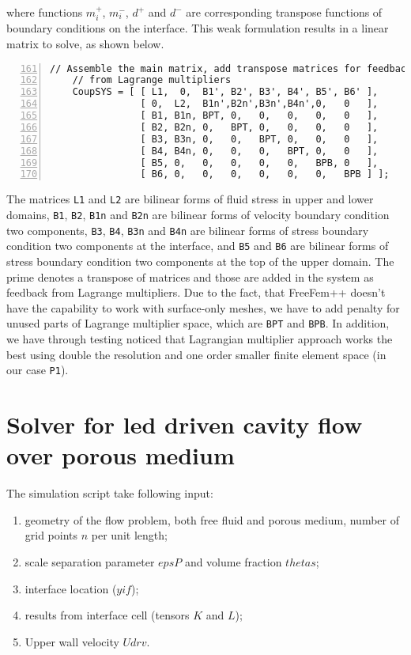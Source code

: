 \documentclass[12pt,a4paper]{article}
\begin{document}
where functions $m^{+}_i$, $m^{-}_i$, $d^{+}$ and $d^{-}$ are corresponding transpose functions of boundary conditions on the interface. This weak formulation results in a linear matrix to solve, as shown below.
\begin{lstlisting}[numbers=left,firstnumber=161]
    // Assemble the main matrix, add transpose matrices for feedback
    // from Lagrange multipliers
    CoupSYS = [ [ L1,  0,  B1', B2', B3', B4', B5', B6' ],
                [ 0,  L2,  B1n',B2n',B3n',B4n',0,   0   ],
                [ B1, B1n, BPT, 0,   0,   0,   0,   0   ],
                [ B2, B2n, 0,   BPT, 0,   0,   0,   0   ],
                [ B3, B3n, 0,   0,   BPT, 0,   0,   0   ],
                [ B4, B4n, 0,   0,   0,   BPT, 0,   0   ],
                [ B5, 0,   0,   0,   0,   0,   BPB, 0   ],
                [ B6, 0,   0,   0,   0,   0,   0,   BPB ] ];
\end{lstlisting}

The matrices \texttt{L1} and \texttt{L2} are bilinear forms of fluid stress in upper and lower domains, \texttt{B1}, \texttt{B2}, \texttt{B1n} and \texttt{B2n} are bilinear forms of velocity boundary condition two components,  \texttt{B3}, \texttt{B4}, \texttt{B3n} and \texttt{B4n} are bilinear forms of stress boundary condition two components at the interface, and \texttt{B5} and \texttt{B6} are bilinear forms of stress boundary condition two components at the top of the upper domain. The prime denotes a transpose of matrices and those are added in the system as feedback from Lagrange multipliers. Due to the fact, that FreeFem++ doesn't have the capability to work with surface-only meshes, we have to add penalty for unused parts of Lagrange multiplier space, which are \texttt{BPT} and \texttt{BPB}. In addition, we have through testing noticed that Lagrangian multiplier approach works the best using double the resolution and one order smaller finite element space (in our case \texttt{P1}).

\section{Solver for led driven cavity flow over porous medium}

The simulation script take following input:
\begin{enumerate}
    \item geometry of the flow problem, both free fluid and porous medium, number of grid points $n$ per unit length;
	\item scale separation parameter $epsP$ and volume fraction $thetas$;
    \item interface location ($yif$);
    \item results from interface cell (tensors $K$ and $L$);
    \item Upper wall velocity $Udrv$.
\end{enumerate}
\end{document}
